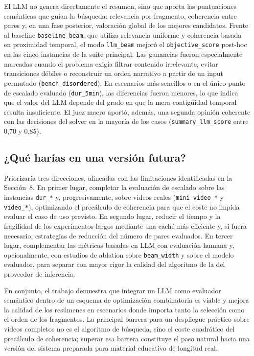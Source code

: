 \documentclass[12pt,a4paper]{article}
\begin{document}
El LLM no genera directamente el resumen, sino que aporta las puntuaciones semánticas que guían la búsqueda: relevancia por fragmento, coherencia entre pares y, en una fase posterior, valoración global de los mejores candidatos. Frente al baseline \texttt{baseline\_beam}, que utiliza relevancia uniforme y coherencia basada en proximidad temporal, el modo \texttt{llm\_beam} mejoró el \texttt{objective\_score} post-hoc en las cinco instancias de la suite principal. Las ganancias fueron especialmente marcadas cuando el problema exigía filtrar contenido irrelevante, evitar transiciones débiles o reconstruir un orden narrativo a partir de un input permutado (\texttt{bench\_disordered}). En escenarios más sencillos o en el único punto de escalado evaluado (\texttt{dur\_5min}), las diferencias fueron menores, lo que indica que el valor del LLM depende del grado en que la mera contigüidad temporal resulta insuficiente. El juez macro aportó, además, una segunda opinión coherente con las decisiones del solver en la mayoría de los casos (\texttt{summary\_llm\_score} entre 0{,}70 y 0{,}85).

\subsection{¿Qué harías en una versión futura?}

Priorizaría tres direcciones, alineadas con las limitaciones identificadas en la Sección~8. En primer lugar, completar la evaluación de escalado sobre las instancias \texttt{dur\_*} y, progresivamente, sobre videos reales (\texttt{mini\_video\_*} y \texttt{video\_*}), optimizando el precálculo de coherencia para que el coste no impida evaluar el caso de uso previsto. En segundo lugar, reducir el tiempo y la fragilidad de los experimentos largos mediante una caché más eficiente y, si fuera necesario, estrategias de reducción del número de pares evaluados. En tercer lugar, complementar las métricas basadas en LLM con evaluación humana y, opcionalmente, con estudios de ablation sobre \texttt{beam\_width} y sobre el modelo evaluador, para separar con mayor rigor la calidad del algoritmo de la del proveedor de inferencia.

En conjunto, el trabajo demuestra que integrar un LLM como evaluador semántico dentro de un esquema de optimización combinatoria es viable y mejora la calidad de los resúmenes en escenarios donde importa tanto la selección como el orden de los fragmentos. La principal barrera para un despliegue práctico sobre videos completos no es el algoritmo de búsqueda, sino el coste cuadrático del precálculo de coherencia; superar esa barrera constituye el paso natural hacia una versión del sistema preparada para material educativo de longitud real.
\end{document}
